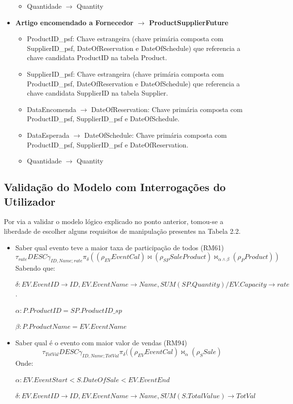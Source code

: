 \documentclass[a4paper,12pt]{scrreprt}
\begin{document}
\begin{itemize}
\begin{itemize}
                \item{Quantidade $\rightarrow$ Quantity}
            \end{itemize}
        \item{\textbf{Artigo encomendado a Fornecedor $\rightarrow$ ProductSupplierFuture}}
            \begin{itemize}
                \item{ProductID\_psf:} Chave estrangeira (chave primária composta com SupplierID\_psf, 
                DateOfReservation e DateOfSchedule) que referencia a chave candidata ProductID na tabela Product.
                \item{SupplierID\_psf:} Chave estrangeira (chave primária composta com ProductID\_psf,
                DateOfReservation e DateOfSchedule) que referencia a chave candidata SupplierID na tabela Supplier.
                \item{DataEncomenda $\rightarrow$ DateOfReservation:} Chave primária composta com ProductID\_psf, SupplierID\_psf e DateOfSchedule.
                \item{DataEsperada $\rightarrow$ DateOfSchedule:} Chave primária composta com ProductID\_psf, 
                SupplierID\_psf e DateOfReservation.
                \item{Quantidade $\rightarrow$ Quantity}
            \end{itemize}
    \end{itemize}

\subsection{Validação do Modelo com Interrogações do Utilizador}
Por via a validar o modelo lógico explicado no ponto anterior, tomou-se a liberdade de escolher alguns requisitos de manipulação presentes na Tabela 2.2.
\usetikzlibrary{positioning}
\begin{itemize}
    \item{Saber qual evento teve a maior taxa de participação de todos (RM61)}
$$\tau_{rate} DESC \gamma_{ID, Name ; rate} \pi_{\delta}( (\rho_{EV}EventCal) \bowtie (\rho_{SP} SaleProduct)  \bowtie_{\alpha \wedge \beta} 
(\rho_P Product)) $$
Sabendo que:

$\delta: EV.EventID\rightarrow ID,EV.EventName\rightarrow Name,SUM(SP.Quantity)/EV.Capacity\rightarrow rate$.

$\alpha: P.ProductID = SP.ProductID\_sp$

$\beta : P.ProductName = EV.EventName$
    \item{Saber qual é o evento com maior valor de vendas (RM94)}
$$\tau_{TotVal} DESC \gamma_{ID, Name; TotVal} \pi_{\delta}( (\rho_{EV} EventCal) \bowtie_{\alpha} (\rho_S Sale )$$
Onde:

$\alpha : EV.EventStart < S.DateOfSale < EV.EventEnd$

$\delta: EV.EventID\rightarrow ID, EV.EventName\rightarrow Name, SUM(S.TotalValue)\rightarrow TotVal$
\end{itemize}
\end{document}
